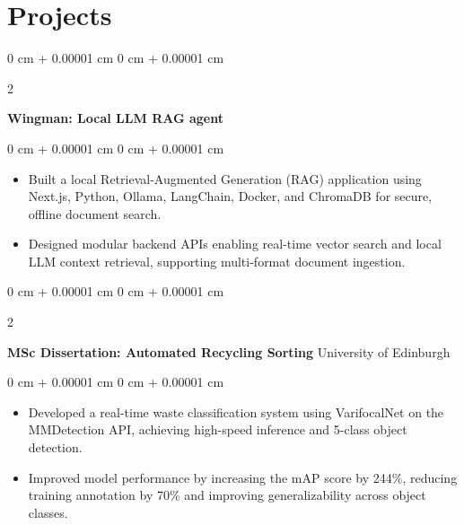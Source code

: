 \documentclass[10pt, letterpaper]{article}
\newenvironment{highlights}{
    \begin{itemize}[
        topsep=0.10 cm,
        parsep=0.10 cm,
        partopsep=0pt,
        itemsep=0pt,
        leftmargin=0 cm + 10pt
    ]
}{
    \end{itemize}
} %
\newenvironment{onecolentry}{
    \begin{adjustwidth}{
        0 cm + 0.00001 cm
    }{
        0 cm + 0.00001 cm
    }
}{
    \end{adjustwidth}
} %
\newenvironment{twocolentry}[2][]{
    \onecolentry
    \def\secondColumn{#2}
    \setcolumnwidth{\fill, 4.5 cm}
    \begin{paracol}{2}
}{
    \switchcolumn \raggedleft \secondColumn
    \end{paracol}
    \endonecolentry
} %
\begin{document}

                


    
    \section{Projects}

        \begin{twocolentry}{
        
        }
            \textbf{Wingman: Local LLM RAG agent}\end{twocolentry}
        \vspace{0.10 cm}
        \begin{onecolentry}
            \begin{highlights}
                \item Built a local Retrieval-Augmented Generation (RAG) application using Next.js, Python, Ollama, LangChain, Docker, and ChromaDB for secure, offline document search.
                \item Designed modular backend APIs enabling real-time vector search and local LLM context retrieval, supporting multi-format document ingestion.
            \end{highlights}
        \end{onecolentry}

        
        \vspace{0.2 cm}

        
        \begin{twocolentry}{
        University of Edinburgh
        }
            \textbf{MSc Dissertation: Automated Recycling Sorting}\end{twocolentry}

        \vspace{0.10 cm}
        \begin{onecolentry}
            \begin{highlights}
                \item Developed a real-time waste classification system using VarifocalNet on the MMDetection API, achieving high-speed inference and 5-class object detection.
                \item Improved model performance by increasing the mAP score by 244\%, reducing training annotation by 70\% and improving generalizability across object classes.
            \end{highlights}
        \end{onecolentry}
\end{document}
